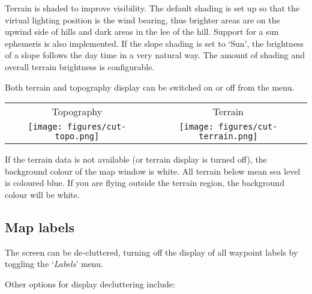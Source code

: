 
Terrain is shaded to improve visibility.  The default shading
is set up so that the virtual lighting position is the wind bearing,
thus brighter areas are on the upwind side of hills and dark areas in
the lee of the hill.  
Support for a sun ephemeris is also implemented. If the slope shading is set 
to `Sun', the brightness of a slope follows the day time in a very natural way.
The amount of shading and overall terrain brightness is configurable. 

Both terrain and topography display can be switched on or off from the
menu.

\begin{center}
\begin{tabular}{c c}
Topography & Terrain \\
\texttt{[image: figures/cut-topo.png]} &
\texttt{[image: figures/cut-terrain.png]}
\end{tabular}
\end{center}

If the terrain data is not available (or terrain display is turned
off), the background colour of the map window is white.  All terrain
below mean sea level is coloured blue.  If you are flying outside the
terrain region, the background colour will be white.

\subsection*{Map labels}\label{sec:maplabels}

The screen can be de-cluttered, turning off the display of all waypoint labels by toggling the `\emph{Labels}' menu.

Other options for display decluttering include:


